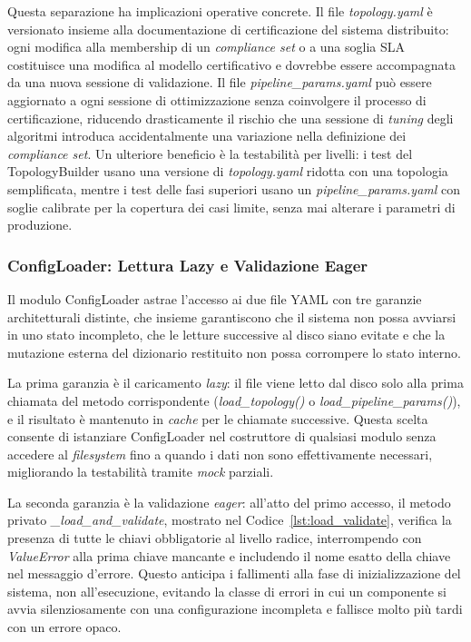 Questa separazione ha implicazioni operative concrete. Il file \textit{topology.yaml} è
versionato insieme alla documentazione di certificazione del sistema distribuito: ogni modifica
alla membership di un \textit{compliance set} o a una soglia \gls{SLA} costituisce una modifica
al modello certificativo e dovrebbe essere accompagnata da una nuova sessione di validazione. Il file
\textit{pipeline\_params.yaml} può essere aggiornato a ogni sessione di ottimizzazione senza
coinvolgere il processo di certificazione, riducendo drasticamente il rischio che una sessione
di \textit{tuning} degli algoritmi introduca accidentalmente una variazione nella definizione
dei \textit{compliance set}. Un ulteriore beneficio è la testabilità per livelli: i test del
TopologyBuilder usano una versione di \textit{topology.yaml} ridotta con una topologia semplificata,
mentre i test delle fasi superiori usano un \textit{pipeline\_params.yaml} con soglie calibrate
per la copertura dei casi limite, senza mai alterare i parametri di produzione.

\subsubsection{ConfigLoader: Lettura Lazy e Validazione Eager}
\label{subsec:config_loader}

Il modulo ConfigLoader astrae l'accesso ai due file YAML con tre garanzie architetturali
distinte, che insieme garantiscono che il sistema non possa avviarsi in uno stato incompleto,
che le letture successive al disco siano evitate e che la mutazione esterna del dizionario
restituito non possa corrompere lo stato interno.

La prima garanzia è il caricamento \textit{lazy}: il file viene letto dal disco solo
alla prima chiamata del metodo corrispondente (\textit{load\_topology()} o
\textit{load\_pipeline\_params()}), e il risultato è mantenuto in \textit{cache} per le chiamate
successive. Questa scelta consente di istanziare ConfigLoader nel costruttore di qualsiasi modulo
senza accedere al \textit{filesystem} fino a quando i dati non sono effettivamente necessari,
migliorando la testabilità tramite \textit{mock} parziali.

La seconda garanzia è la validazione \textit{eager}: all'atto del primo accesso, il
metodo privato \textit{\_load\_and\_validate}, mostrato nel Codice~\ref{lst:load_validate},
verifica la presenza di tutte le chiavi obbligatorie
al livello radice, interrompendo con \textit{ValueError} alla prima chiave mancante e includendo
il nome esatto della chiave nel messaggio d'errore. Questo anticipa i fallimenti alla fase di
inizializzazione del sistema, non all'esecuzione, evitando la classe di errori in cui un componente
si avvia silenziosamente con una configurazione incompleta e fallisce molto più tardi con un errore
opaco.

